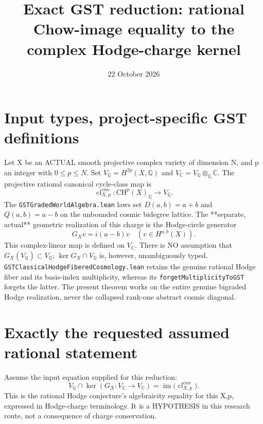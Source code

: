 \documentclass[11pt]{article}
\title{Exact GST reduction: rational Chow-image equality to the complex Hodge-charge kernel}
\date{22 October 2026}
\newcommand{\Q}{\mathbb Q}
\newcommand{\C}{\mathbb C}
\newcommand{\CH}{\mathrm{CH}}
\newcommand{\im}{\operatorname{im}}
\begin{document}
\maketitle

\section{Input types, project-specific GST definitions}
Let X be an ACTUAL smooth projective complex variety of
dimension N, and p an integer with \(0\le p\le N\).
Set \(V_{\Q}=H^{2p}(X,\Q)\) and
\(V_{\C}=V_{\Q}\otimes_{\Q}\C\).
The projective rational canonical cycle-class map is
\[
 \operatorname{cl}^{can}_{X,p}:
       \CH^p(X)_{\Q}\longrightarrow V_{\Q}.
\]
The \texttt{GSTGradedWorldAlgebra.lean} laws set
\(D(a,b)=a+b\) and \(Q(a,b)=a-b\)
on the unbounded cosmic bidegree lattice.
The **separate, actual** geometric realization
of this charge is the Hodge-circle generator
\[
 \boxed{G_Xv=i(a-b)v\quad
            (v\in H^{a,b}(X)).}                   \tag{1}
\]
This complex-linear map is defined on \(V_{\C}\).
There is NO assumption that \(G_X(V_{\Q})\subset V_{\Q}\);
\(\ker G_X\cap V_{\Q}\) is, however, unambiguously typed.
\texttt{GSTClassicalHodgeFiberedCosmology.lean}
retains the genuine rational Hodge fiber and its
basis-index multiplicity, whereas its
\texttt{forgetMultiplicityToGST} forgets the latter.
The present theorem works on the entire genuine
bigraded Hodge realization, never the collapsed
rank-one abstract cosmic diagonal.

\section{Exactly the requested assumed rational statement}
Assume the input equation supplied for this reduction:
\[
 \boxed{
 V_{\Q}\cap\ker(G_X:V_{\C}\to V_{\C})
    =\im\bigl(\operatorname{cl}^{can}_{X,p}\bigr).
 }                                                 \tag{A}
\]
This is the rational Hodge conjecture's
algebraicity equality for this X,p,
expressed in Hodge-charge terminology.
It is a HYPOTHESIS in this research route,
not a consequence of charge conservation.
\end{document}
